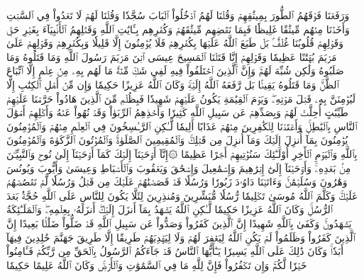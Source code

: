 وَرَفَعۡنَا فَوۡقَهُمُ ٱلطُّورَ بِمِيثَٰقِهِمۡ وَقُلۡنَا لَهُمُ ٱدۡخُلُواْ ٱلۡبَابَ سُجَّدٗا وَقُلۡنَا لَهُمۡ لَا تَعۡدُواْ فِي ٱلسَّبۡتِ وَأَخَذۡنَا مِنۡهُم مِّيثَٰقًا غَلِيظٗا
فَبِمَا نَقۡضِهِم مِّيثَٰقَهُمۡ وَكُفۡرِهِم بِـَٔايَٰتِ ٱللَّهِ وَقَتۡلِهِمُ ٱلۡأَنۢبِيَآءَ بِغَيۡرِ حَقّٖ وَقَوۡلِهِمۡ قُلُوبُنَا غُلۡفُۢۚ بَلۡ طَبَعَ ٱللَّهُ عَلَيۡهَا بِكُفۡرِهِمۡ فَلَا يُؤۡمِنُونَ إِلَّا قَلِيلٗا
وَبِكُفۡرِهِمۡ وَقَوۡلِهِمۡ عَلَىٰ مَرۡيَمَ بُهۡتَٰنًا عَظِيمٗا
وَقَوۡلِهِمۡ إِنَّا قَتَلۡنَا ٱلۡمَسِيحَ عِيسَى ٱبۡنَ مَرۡيَمَ رَسُولَ ٱللَّهِ وَمَا قَتَلُوهُ وَمَا صَلَبُوهُ وَلَٰكِن شُبِّهَ لَهُمۡۚ وَإِنَّ ٱلَّذِينَ ٱخۡتَلَفُواْ فِيهِ لَفِي شَكّٖ مِّنۡهُۚ مَا لَهُم بِهِۦ مِنۡ عِلۡمٍ إِلَّا ٱتِّبَاعَ ٱلظَّنِّۚ وَمَا قَتَلُوهُ يَقِينَۢا
بَل رَّفَعَهُ ٱللَّهُ إِلَيۡهِۚ وَكَانَ ٱللَّهُ عَزِيزًا حَكِيمٗا
وَإِن مِّنۡ أَهۡلِ ٱلۡكِتَٰبِ إِلَّا لَيُؤۡمِنَنَّ بِهِۦ قَبۡلَ مَوۡتِهِۦۖ وَيَوۡمَ ٱلۡقِيَٰمَةِ يَكُونُ عَلَيۡهِمۡ شَهِيدٗا
فَبِظُلۡمٖ مِّنَ ٱلَّذِينَ هَادُواْ حَرَّمۡنَا عَلَيۡهِمۡ طَيِّبَٰتٍ أُحِلَّتۡ لَهُمۡ وَبِصَدِّهِمۡ عَن سَبِيلِ ٱللَّهِ كَثِيرٗا
وَأَخۡذِهِمُ ٱلرِّبَوٰاْ وَقَدۡ نُهُواْ عَنۡهُ وَأَكۡلِهِمۡ أَمۡوَٰلَ ٱلنَّاسِ بِٱلۡبَٰطِلِۚ وَأَعۡتَدۡنَا لِلۡكَٰفِرِينَ مِنۡهُمۡ عَذَابًا أَلِيمٗا
لَّـٰكِنِ ٱلرَّـٰسِخُونَ فِي ٱلۡعِلۡمِ مِنۡهُمۡ وَٱلۡمُؤۡمِنُونَ يُؤۡمِنُونَ بِمَآ أُنزِلَ إِلَيۡكَ وَمَآ أُنزِلَ مِن قَبۡلِكَۚ وَٱلۡمُقِيمِينَ ٱلصَّلَوٰةَۚ وَٱلۡمُؤۡتُونَ ٱلزَّكَوٰةَ وَٱلۡمُؤۡمِنُونَ بِٱللَّهِ وَٱلۡيَوۡمِ ٱلۡأٓخِرِ أُوْلَـٰٓئِكَ سَنُؤۡتِيهِمۡ أَجۡرًا عَظِيمًا
۞إِنَّآ أَوۡحَيۡنَآ إِلَيۡكَ كَمَآ أَوۡحَيۡنَآ إِلَىٰ نُوحٖ وَٱلنَّبِيِّـۧنَ مِنۢ بَعۡدِهِۦۚ وَأَوۡحَيۡنَآ إِلَىٰٓ إِبۡرَٰهِيمَ وَإِسۡمَٰعِيلَ وَإِسۡحَٰقَ وَيَعۡقُوبَ وَٱلۡأَسۡبَاطِ وَعِيسَىٰ وَأَيُّوبَ وَيُونُسَ وَهَٰرُونَ وَسُلَيۡمَٰنَۚ وَءَاتَيۡنَا دَاوُۥدَ زَبُورٗا
وَرُسُلٗا قَدۡ قَصَصۡنَٰهُمۡ عَلَيۡكَ مِن قَبۡلُ وَرُسُلٗا لَّمۡ نَقۡصُصۡهُمۡ عَلَيۡكَۚ وَكَلَّمَ ٱللَّهُ مُوسَىٰ تَكۡلِيمٗا
رُّسُلٗا مُّبَشِّرِينَ وَمُنذِرِينَ لِئَلَّا يَكُونَ لِلنَّاسِ عَلَى ٱللَّهِ حُجَّةُۢ بَعۡدَ ٱلرُّسُلِۚ وَكَانَ ٱللَّهُ عَزِيزًا حَكِيمٗا
لَّـٰكِنِ ٱللَّهُ يَشۡهَدُ بِمَآ أَنزَلَ إِلَيۡكَۖ أَنزَلَهُۥ بِعِلۡمِهِۦۖ وَٱلۡمَلَـٰٓئِكَةُ يَشۡهَدُونَۚ وَكَفَىٰ بِٱللَّهِ شَهِيدًا
إِنَّ ٱلَّذِينَ كَفَرُواْ وَصَدُّواْ عَن سَبِيلِ ٱللَّهِ قَدۡ ضَلُّواْ ضَلَٰلَۢا بَعِيدًا
إِنَّ ٱلَّذِينَ كَفَرُواْ وَظَلَمُواْ لَمۡ يَكُنِ ٱللَّهُ لِيَغۡفِرَ لَهُمۡ وَلَا لِيَهۡدِيَهُمۡ طَرِيقًا
إِلَّا طَرِيقَ جَهَنَّمَ خَٰلِدِينَ فِيهَآ أَبَدٗاۚ وَكَانَ ذَٰلِكَ عَلَى ٱللَّهِ يَسِيرٗا
يَـٰٓأَيُّهَا ٱلنَّاسُ قَدۡ جَآءَكُمُ ٱلرَّسُولُ بِٱلۡحَقِّ مِن رَّبِّكُمۡ فَـَٔامِنُواْ خَيۡرٗا لَّكُمۡۚ وَإِن تَكۡفُرُواْ فَإِنَّ لِلَّهِ مَا فِي ٱلسَّمَٰوَٰتِ وَٱلۡأَرۡضِۚ وَكَانَ ٱللَّهُ عَلِيمًا حَكِيمٗا

